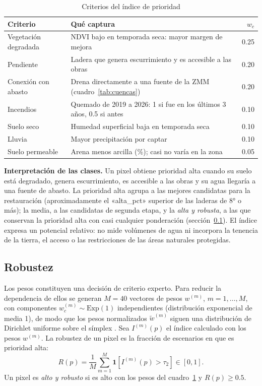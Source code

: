 \begin{table}[H]\centering\small
\caption{Criterios del índice de prioridad}\label{tab:criterios}
\begin{tabularx}{\linewidth}{lXr}
\toprule
Criterio & Qué captura & $w_c$ \\
\midrule
Vegetación degradada & NDVI bajo en temporada seca: mayor margen de mejora & 0.25 \\
Pendiente & Ladera que genera escurrimiento y es accesible a las obras & 0.20 \\
Conexión con abasto & Drena directamente a una fuente de la ZMM (cuadro~\ref{tab:cuencas}) & 0.20 \\
Incendios & Quemado de 2019 a 2026: 1 si fue en los últimos 3 años, 0.5 si antes & 0.10 \\
Suelo seco & Humedad superficial baja en temporada seca & 0.10 \\
Lluvia & Mayor precipitación por captar & 0.10 \\
Suelo permeable & Arena menos arcilla (\%); casi no varía en la zona & 0.05 \\
\bottomrule
\end{tabularx}
\end{table}

\textbf{Interpretación de las clases.} Un pixel obtiene prioridad alta cuando su suelo está degradado, genera escurrimiento, es accesible a las obras y su agua llegaría a una fuente de abasto. La prioridad alta agrupa a las mejores candidatas para la restauración (aproximadamente el «alta_pct» superior de las laderas de 8° o más); la media, a las candidatas de segunda etapa, y la \emph{alta y robusta}, a las que conservan la prioridad alta con casi cualquier ponderación (sección~\ref{sec:robustez}). El índice expresa un potencial relativo: no mide volúmenes de agua ni incorpora la tenencia de la tierra, el acceso o las restricciones de las áreas naturales protegidas.

\subsection{Robustez}\label{sec:robustez}

Los pesos constituyen una decisión de criterio experto. Para reducir la dependencia de ellos se generan $M=40$ vectores de pesos $w^{(m)}$, $m=1,\dots,M$, con componentes $w^{(m)}_c \sim \text{Exp}(1)$ independientes (distribución exponencial de media 1), de modo que los pesos normalizados $\tilde w^{(m)}$ siguen una distribución de Dirichlet uniforme sobre el símplex . Sea $I^{(m)}(p)$ el índice calculado con los pesos $w^{(m)}$. La robustez de un pixel es la fracción de escenarios en que es prioridad alta:
\begin{equation}
R(p)=\frac{1}{M}\sum_{m=1}^{M}\mathbf{1}\!\left[I^{(m)}(p)>\tau_2\right]\in[0,1].
\end{equation}
Un pixel es \emph{alto y robusto} si es alto con los pesos del cuadro~\ref{tab:criterios} y $R(p)\ge 0.5$.

